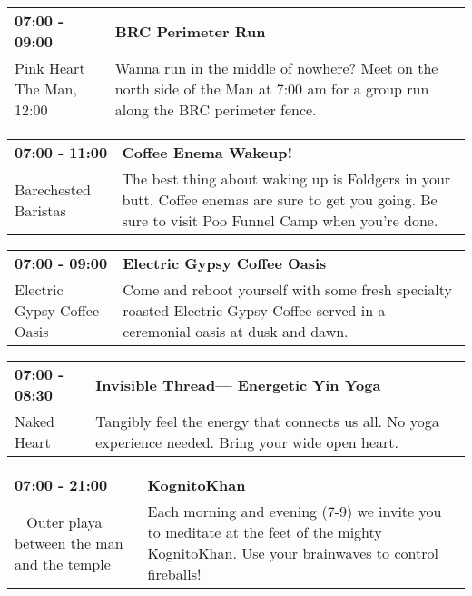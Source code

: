 \begin{tabular}{ p{1in} p{2.2in} }
    \textbf{07:00 - 09:00} & \textbf{BRC Perimeter Run} \\
    Pink Heart \newline The Man, 12:00 & Wanna run in the middle of nowhere? Meet on the north side of the Man at 7:00 am for a group run along the BRC perimeter fence. \\
    \hline 
\end{tabular}
    
\begin{tabular}{ p{1in} p{2.2in} }
    \textbf{07:00 - 11:00} & \textbf{Coffee Enema Wakeup!} \\
    Barechested Baristas \newline  & The best thing about waking up is Foldgers in your butt. Coffee enemas are sure to get you going. Be sure to visit Poo Funnel Camp when you're done. \\
    \hline 
\end{tabular}
    
\begin{tabular}{ p{1in} p{2.2in} }
    \textbf{07:00 - 09:00} & \textbf{Electric Gypsy Coffee Oasis} \\
    Electric Gypsy Coffee Oasis \newline  & Come and reboot yourself with some fresh specialty roasted Electric Gypsy Coffee served in a ceremonial oasis at dusk and dawn. \\
    \hline 
\end{tabular}
    
\begin{tabular}{ p{1in} p{2.2in} }
    \textbf{07:00 - 08:30} & \textbf{Invisible Thread--- Energetic Yin Yoga} \\
    Naked Heart \newline  & Tangibly feel the energy that connects us all. No yoga experience needed. Bring your wide open heart. \\
    \hline 
\end{tabular}
    
\begin{tabular}{ p{1in} p{2.2in} }
    \textbf{07:00 - 21:00} & \textbf{KognitoKhan} \\
    ~ \newline Outer playa between the man and the temple & Each morning and evening (7-9) we invite you to meditate at the feet of the mighty KognitoKhan. Use your brainwaves to control fireballs! \\
    \hline 
\end{tabular}
    
